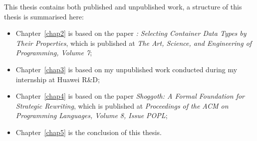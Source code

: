 This thesis contains both published and unpublished work, a structure of this thesis is summarised here:
\begin{itemize}
    \item Chapter~\ref{chap2} is based on the paper \emph{\Primrose{}: Selecting Container Data Types by Their Properties}, which is published at \emph{The Art, Science, and Engineering of Programming, Volume 7};
    \item Chapter~\ref{chap3} is based on my unpublished work conducted during my internship at Huawei R\&D;
    \item Chapter~\ref{chap4} is based on the paper \emph{Shoggoth: A Formal Foundation for Strategic Rewriting}, which is published at \emph{Proceedings of the ACM on Programming Languages, Volume 8, Issue POPL};
    \item Chapter~\ref{chap5} is the conclusion of this thesis.
\end{itemize}


